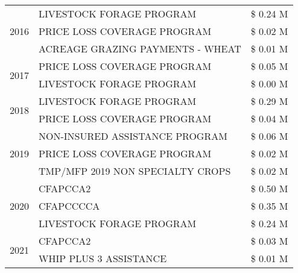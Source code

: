 \begin{tabular}{llr}
\cline{1-3}
\multirow[t]{3}{*}{2016} & LIVESTOCK FORAGE PROGRAM & \$ 0.24 M \\
 & PRICE LOSS COVERAGE PROGRAM & \$ 0.02 M \\
 & ACREAGE GRAZING PAYMENTS - WHEAT & \$ 0.01 M \\
\cline{1-3}
\multirow[t]{2}{*}{2017} & PRICE LOSS COVERAGE PROGRAM & \$ 0.05 M \\
 & LIVESTOCK FORAGE PROGRAM & \$ 0.00 M \\
\cline{1-3}
\multirow[t]{2}{*}{2018} & LIVESTOCK FORAGE PROGRAM & \$ 0.29 M \\
 & PRICE LOSS COVERAGE PROGRAM & \$ 0.04 M \\
\cline{1-3}
\multirow[t]{3}{*}{2019} & NON-INSURED ASSISTANCE PROGRAM & \$ 0.06 M \\
 & PRICE LOSS COVERAGE PROGRAM & \$ 0.02 M \\
 & TMP/MFP 2019 NON SPECIALTY CROPS & \$ 0.02 M \\
\cline{1-3}
\multirow[t]{3}{*}{2020} & CFAPCCA2 & \$ 0.50 M \\
 & CFAPCCCCA & \$ 0.35 M \\
 & LIVESTOCK FORAGE PROGRAM & \$ 0.24 M \\
\cline{1-3}
\multirow[t]{2}{*}{2021} & CFAPCCA2 & \$ 0.03 M \\
 & WHIP PLUS 3 ASSISTANCE & \$ 0.01 M \\
\cline{1-3}
\bottomrule
\end{tabular}
